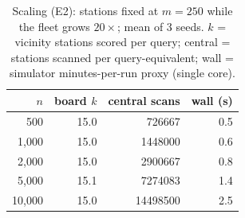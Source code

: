 \begin{table}
\centering
\caption{Scaling (E2): stations fixed at $m=250$ while the fleet grows
$20\times$; mean of 3 seeds.  $k$ = vicinity stations scored per query;
central = stations scanned per query-equivalent; wall = simulator
minutes-per-run proxy (single core).}
\label{tab:e2}
\begin{tabular}{@{}rrrr@{}}
\toprule
$n$ & board $k$ & central scans & wall (s) \\
\midrule
500 & 15.0 & 726667 & 0.5 \\
1,000 & 15.0 & 1448000 & 0.6 \\
2,000 & 15.0 & 2900667 & 0.8 \\
5,000 & 15.1 & 7274083 & 1.4 \\
10,000 & 15.0 & 14498500 & 2.5 \\
\bottomrule
\end{tabular}
\end{table}
